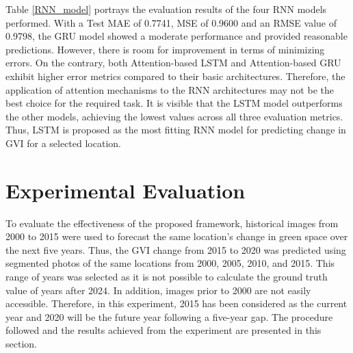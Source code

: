 Table \ref{RNN_model} portrays the evaluation results of the four RNN models performed. With a Test MAE of 0.7741, MSE of 0.9600 and an RMSE value of 0.9798, the GRU model showed a moderate performance and provided reasonable predictions. However, there is room for improvement in terms of minimizing errors. On the contrary, both Attention-based LSTM and Attention-based GRU exhibit higher error metrics compared to their basic architectures. Therefore, the application of attention mechanisms to the RNN architectures may not be the best choice for the required task. It is visible that the LSTM model outperforms the other models, achieving the lowest values across all three evaluation metrics.  Thus, LSTM is proposed as the most fitting RNN model for predicting change in GVI for a selected location. 


\section{Experimental Evaluation}
To evaluate the effectiveness of the proposed framework, historical images from 2000 to 2015 were used to forecast the same location's change in green space over the next five years. Thus, the GVI change from 2015 to 2020 was predicted using segmented photos of the same locations from 2000, 2005, 2010, and 2015. This range of years was selected as it is not possible to calculate the ground truth value of years after 2024. In addition, images prior to 2000 are not easily accessible. Therefore, in this experiment,  2015 has been considered as the current year and 2020 will be the future year following a five-year gap. The procedure followed and the results achieved from the experiment are presented in this section.
